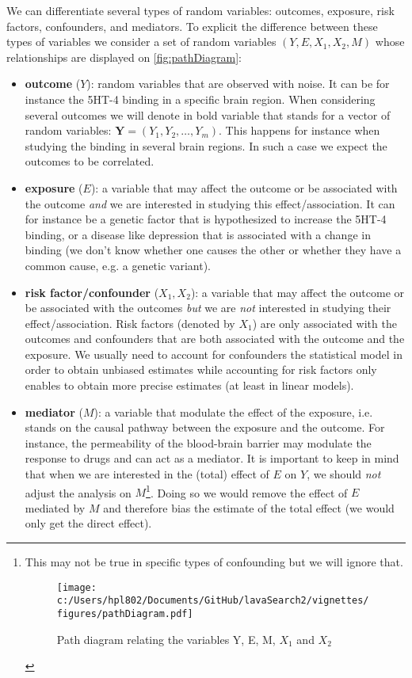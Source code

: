 \documentclass{article}
\begin{document}
We can differentiate several types of random variables: outcomes,
exposure, risk factors, confounders, and mediators. To explicit the
difference between these types of variables we consider a set of
random variables \((Y,E,X_1,X_2,M)\) whose relationships are
displayed on \autoref{fig:pathDiagram}:
\begin{itemize}
\item \textbf{outcome} (\(Y\)): random variables that are observed with noise. It
can be for instance the 5HT-4 binding in a specific brain
region. When considering several outcomes we will denote in bold
variable that stands for a vector of random variables:
\(\mathbf{Y}=(Y_1,Y_2,\ldots,Y_m)\). This happens for instance when
studying the binding in several brain regions. In such a case we
expect the outcomes to be correlated.
\item \textbf{exposure} (\(E\)): a variable that may affect the outcome or be
associated with the outcome \emph{and} we are interested in studying this
effect/association. It can for instance be a genetic factor that is
hypothesized to increase the 5HT-4 binding, or a disease like
depression that is associated with a change in binding (we don't
know whether one causes the other or whether they have a common
cause, e.g. a genetic variant).
\item \textbf{risk factor/confounder} (\(X_1,X_2\)): a variable that
may affect the outcome or be associated with the outcomes \emph{but} we
are \emph{not} interested in studying their effect/association. Risk
factors (denoted by \(X_1\)) are only associated with the outcomes
and confounders that are both associated with the outcome and the
exposure. We usually need to account for confounders the statistical
model in order to obtain unbiased estimates while accounting for
risk factors only enables to obtain more precise estimates (at least
in linear models).
\item \textbf{mediator} (\(M\)): a variable that modulate the effect of the
exposure, i.e. stands on the causal pathway between the exposure and
the outcome. For instance, the permeability of the blood-brain
barrier may modulate the response to drugs and can act as a
mediator. It is important to keep in mind that when we are
interested in the (total) effect of \(E\) on \(Y\), we should \emph{not}
adjust the analysis on \(M\)\footnote{This may not be true in specific types of confounding but we
will ignore that.

\begin{figure}[htbp]
\centering
\texttt{[image: c:/Users/hpl802/Documents/GitHub/lavaSearch2/vignettes/figures/pathDiagram.pdf]}
\caption{\label{fig:pathDiagram}
Path diagram relating the variables Y, E, M, \(X_1\) and \(X_2\)}
\end{figure}}. Doing so we would remove the effect of
\(E\) mediated by \(M\) and therefore bias the estimate of the total
effect (we would only get the direct effect).
\end{itemize}
\end{document}
